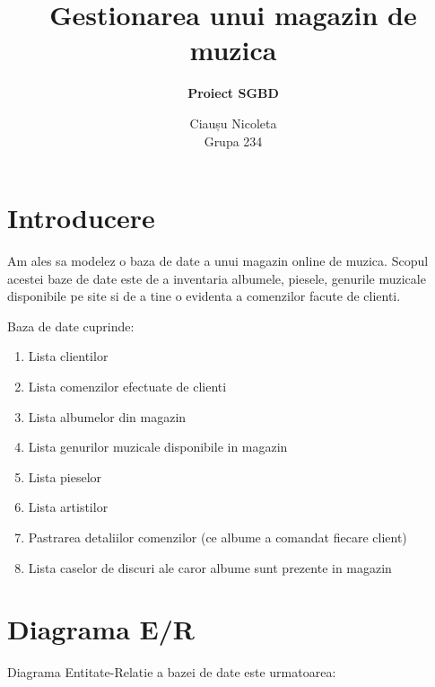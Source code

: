 \documentclass{article}
\title{\textbf{Gestionarea unui magazin de muzica}}
\subtitle{\textbf{Proiect SGBD}}
\author{Ciaușu Nicoleta \\ Grupa 234}
\date{}
\begin{document}
\begin{titlingpage}
\maketitle
\end{titlingpage}
\newpage
\renewcommand{\contentsname}{Cuprins}
\tableofcontents

\clearpage


\section{Introducere}
Am ales sa modelez o baza de date a unui magazin online de muzica. Scopul acestei baze de date este de a inventaria albumele, piesele, genurile muzicale disponibile pe site si de a tine o evidenta a comenzilor facute de clienti.

Baza de date cuprinde:
\begin{enumerate}
    \item Lista clientilor
    \item Lista comenzilor efectuate de clienti
    \item Lista albumelor din magazin
    \item Lista genurilor muzicale disponibile in magazin
    \item Lista pieselor
    \item Lista artistilor
    \item Pastrarea detaliilor comenzilor (ce albume a comandat fiecare client)
    \item Lista caselor de discuri ale caror albume sunt prezente in magazin
\end{enumerate}

\newpage

\section{Diagrama E/R}
Diagrama Entitate-Relatie a bazei de date este urmatoarea:

\vspace{0.5cm}
\end{document}
